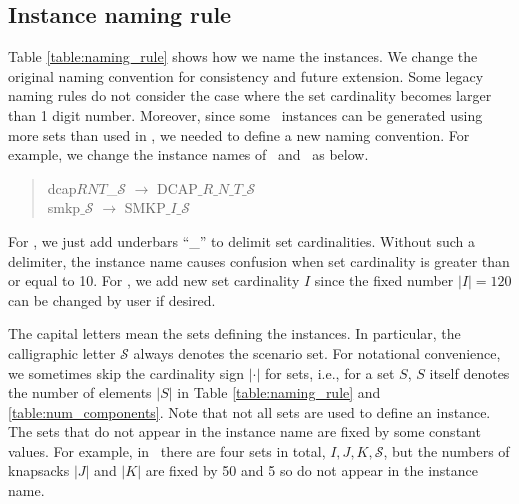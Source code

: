 \subsection{Instance naming rule}
Table \ref{table:naming_rule} shows how we name the instances. We change the original naming convention for consistency and future extension. Some legacy naming rules do not consider the case where the set cardinality becomes larger than 1 digit number. Moreover, since some \siplibtwo\ instances can be generated using more sets than used in \siplib, we needed to define a new naming convention. For example, we change the instance names of \dcap\ and \smkp\ as below.
\begin{quote}
	\centering dcap$RNT$\_$\mathcal{S}$ $\longrightarrow$ DCAP$\_R\_N\_T\_\mathcal{S}$\\
	smkp$\_\mathcal{S}$ $\longrightarrow$ SMKP$\_I\_\mathcal{S}$
\end{quote}
For \dcap, we just add underbars ``\_'' to delimit set cardinalities. Without such a delimiter, the instance name causes confusion when set cardinality is greater than or equal to 10. For \smkp, we add new set cardinality $I$ since the fixed number $|I|=120$ can be changed by user if desired.

The capital letters mean the sets defining the instances. In particular, the calligraphic letter $\mathcal{S}$ always denotes the scenario set. For notational convenience, we sometimes skip the cardinality sign $|\cdot|$ for sets, i.e., for a set $S$, $S$ itself denotes the number of elements $|S|$ in Table \ref{table:naming_rule} and \ref{table:num_components}. Note that not all sets are used to define an instance. The sets that do not appear in the instance name are fixed by some constant values. For example, in \smkp\ there are four sets in total, $I,J,K,\mathcal{S}$, but the numbers of knapsacks $|J|$ and $|K|$ are fixed by 50 and 5 so do not appear in the instance name.

